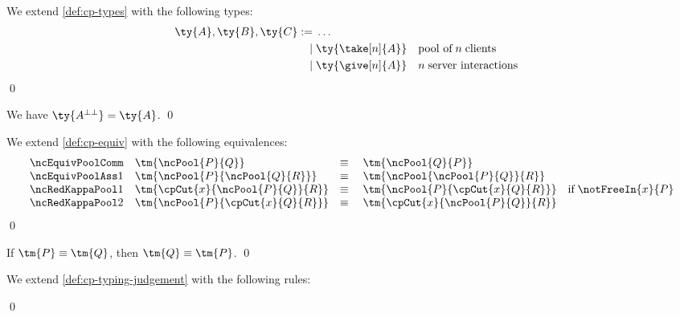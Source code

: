 \documentclass[UKenglish]{llncs}
\begin{document}
\begin{definition}[Types]\label{def:nc-types}
  We extend \cref{def:cp-types} with the following types:
  \[\!
    \begin{aligned}
      \ty{A}, \ty{B}, \ty{C}
           :=& \; \dots
      \\ \mid& \; \ty{\take[n]{A}} &&\text{pool of} \; n \; \text{clients}
      \\ \mid& \; \ty{\give[n]{A}} &&n \; \text{server interactions}
    \end{aligned}
  \]  
  \qed
\end{definition}

\begin{lemma}[Involutive]\label{thm:nc-negation-involutive}
  We have $\ty{A^{\bot\bot}} = \ty{A}$.
  \qed
\end{lemma}

\begin{definition}\label{def:nc-equiv}
  We extend \cref{def:cp-equiv} with the following equivalences:
  \[
    \begin{array}{llll}
      \ncEquivPoolComm
      & \tm{\ncPool{P}{Q}}
      & \equiv \;
      & \tm{\ncPool{Q}{P}}
      \\
      \ncEquivPoolAss1
      & \tm{\ncPool{P}{\ncPool{Q}{R}}}
      & \equiv \;
      & \tm{\ncPool{\ncPool{P}{Q}}{R}}
      \\
      \ncRedKappaPool1
      & \tm{\cpCut{x}{\ncPool{P}{Q}}{R}}
      & \equiv \;
      & \tm{\ncPool{P}{\cpCut{x}{Q}{R}}} \quad \text{if} \; \notFreeIn{x}{P} 
      \\
      \ncRedKappaPool2
      & \tm{\ncPool{P}{\cpCut{x}{Q}{R}}}
      & \equiv \;
      & \tm{\cpCut{x}{\ncPool{P}{Q}}{R}}
    \end{array}
  \]
  \qed
\end{definition}

\begin{theorem}[Symmetry]\label{thm:nc-symmetry}
  If $\tm{P} \equiv \tm{Q}$, then $\tm{Q} \equiv \tm{P}$.
  \qed
\end{theorem}

\begin{definition}\label{def:nc-typing-judgement}
  We extend \cref{def:cp-typing-judgement} with the following rules:
  {\normalfont
    \begin{center}   \end{center}
    \begin{center} \ncInfPool  \ncInfCont  \end{center}
  }
  \qed
\end{definition}
\end{document}
